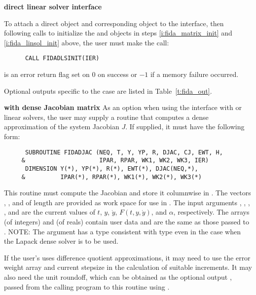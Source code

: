 \begin{Steps}

  {\bf {\idadls} direct linear solver interface}
  
  To attach a direct {\sunlinsol} object and corresponding
  {\sunmatrix} object to the {\idadls} interface, then following calls
  to initialize the {\sunlinsol} and {\sunmatrix} objects in steps
  \ref{i:fida_matrix_init} and \ref{i:fida_linsol_init} above, the user
  must make the call: 
\begin{verbatim}
      CALL FIDADLSINIT(IER)
\end{verbatim}
   is an error return flag set on $0$ on success or $-1$ if a memory 
  failure occurred.

  Optional outputs specific to the {\idadls} case are listed in
  Table~\ref{t:fida_out}.

  {\bf {\idadls} with dense Jacobian matrix}
  As an option when using the {\idadls} interface with
  {\sunlinsoldense} or {\sunlinsollapdense} linear solvers, the user
  may supply a routine that computes a dense approximation of the
  system Jacobian  $J$. If supplied, it must
  have the following form: 
\begin{verbatim}
      SUBROUTINE FIDADJAC (NEQ, T, Y, YP, R, DJAC, CJ, EWT, H,
     &                     IPAR, RPAR, WK1, WK2, WK3, IER)
      DIMENSION Y(*), YP(*), R(*), EWT(*), DJAC(NEQ,*), 
     &          IPAR(*), RPAR(*), WK1(*), WK2(*), WK3(*)
\end{verbatim}
  This routine must compute the Jacobian and store it columnwise in .
  The vectors , , and  of length  are provided
  as work space for use in .
  The input arguments , , , , and  are the
  current values of $t$, $y$, $\dot{y}$, $F(t,y,\dot{y})$, and $\alpha$, respectively.
  The arrays  (of integers) and  (of reals) contain user data
  and are the same as those passed to .
  NOTE: The argument  has a type consistent with {\CC} type 
  even in the case when the Lapack dense solver is to be used.

  If the user's  uses difference quotient approximations, it
  may need to use the error weight array  and current stepsize 
  in the calculation of suitable increments.  It may also need the unit
  roundoff, which can be obtained as the optional output ,
  passed from the calling program to this routine using .


\end{Steps}
